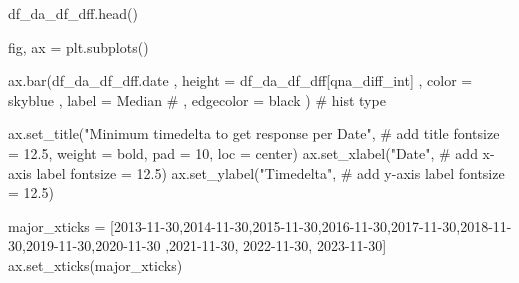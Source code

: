 \documentclass[
  letterpaper,
  DIV=11,
  numbers=noendperiod]{scrartcl}
\newenvironment{Shaded}{\begin{snugshade}}{\end{snugshade}}
\newcommand{\CommentTok}[1]{\textcolor[rgb]{0.37,0.37,0.37}{#1}}
\newcommand{\DecValTok}[1]{\textcolor[rgb]{0.68,0.00,0.00}{#1}}
\newcommand{\FloatTok}[1]{\textcolor[rgb]{0.68,0.00,0.00}{#1}}
\newcommand{\NormalTok}[1]{\textcolor[rgb]{0.00,0.23,0.31}{#1}}
\newcommand{\OperatorTok}[1]{\textcolor[rgb]{0.37,0.37,0.37}{#1}}
\newcommand{\StringTok}[1]{\textcolor[rgb]{0.13,0.47,0.30}{#1}}
\begin{document}
\begin{Shaded}
\begin{Highlighting}[]
\NormalTok{df\_da\_df\_dff.head()}
\end{Highlighting}
\end{Shaded}

\begin{Shaded}
\begin{Highlighting}[]
\NormalTok{fig, ax }\OperatorTok{=}\NormalTok{ plt.subplots()}

\NormalTok{ax.bar(df\_da\_df\_dff.date}
\NormalTok{    ,  height }\OperatorTok{=}\NormalTok{ df\_da\_df\_dff[}\StringTok{\textquotesingle{}qna\_diff\_int\textquotesingle{}}\NormalTok{]}
\NormalTok{    ,  color }\OperatorTok{=} \StringTok{\textquotesingle{}skyblue\textquotesingle{}}
\NormalTok{    ,  label }\OperatorTok{=} \StringTok{\textquotesingle{}Median\textquotesingle{}}
    \CommentTok{\# ,  edgecolor = \textquotesingle{}black\textquotesingle{}}
\NormalTok{      ) }\CommentTok{\# hist type}

\NormalTok{ax.set\_title(}\StringTok{"Minimum timedelta to get response per Date"}\NormalTok{, }\CommentTok{\# add title}
\NormalTok{             fontsize }\OperatorTok{=} \FloatTok{12.5}\NormalTok{,}
\NormalTok{             weight }\OperatorTok{=} \StringTok{\textquotesingle{}bold\textquotesingle{}}\NormalTok{,}
\NormalTok{             pad }\OperatorTok{=} \DecValTok{10}\NormalTok{,}
\NormalTok{             loc }\OperatorTok{=} \StringTok{\textquotesingle{}center\textquotesingle{}}\NormalTok{)}
\NormalTok{ax.set\_xlabel(}\StringTok{"Date"}\NormalTok{, }\CommentTok{\# add x{-}axis label}
\NormalTok{              fontsize }\OperatorTok{=} \FloatTok{12.5}\NormalTok{)}
\NormalTok{ax.set\_ylabel(}\StringTok{"Timedelta"}\NormalTok{, }\CommentTok{\# add y{-}axis label}
\NormalTok{              fontsize }\OperatorTok{=} \FloatTok{12.5}\NormalTok{)}

\NormalTok{major\_xticks }\OperatorTok{=}\NormalTok{ [}\StringTok{\textquotesingle{}2013{-}11{-}30\textquotesingle{}}\NormalTok{,}\StringTok{\textquotesingle{}2014{-}11{-}30\textquotesingle{}}\NormalTok{,}\StringTok{\textquotesingle{}2015{-}11{-}30\textquotesingle{}}\NormalTok{,}\StringTok{\textquotesingle{}2016{-}11{-}30\textquotesingle{}}\NormalTok{,}\StringTok{\textquotesingle{}2017{-}11{-}30\textquotesingle{}}\NormalTok{,}\StringTok{\textquotesingle{}2018{-}11{-}30\textquotesingle{}}\NormalTok{,}\StringTok{\textquotesingle{}2019{-}11{-}30\textquotesingle{}}\NormalTok{,}\StringTok{\textquotesingle{}2020{-}11{-}30\textquotesingle{}}
\NormalTok{                ,}\StringTok{\textquotesingle{}2021{-}11{-}30\textquotesingle{}}\NormalTok{, }\StringTok{\textquotesingle{}2022{-}11{-}30\textquotesingle{}}\NormalTok{, }\StringTok{\textquotesingle{}2023{-}11{-}30\textquotesingle{}}\NormalTok{]}
\NormalTok{ax.set\_xticks(major\_xticks)}


\end{Highlighting}
\end{Shaded}
\end{document}
